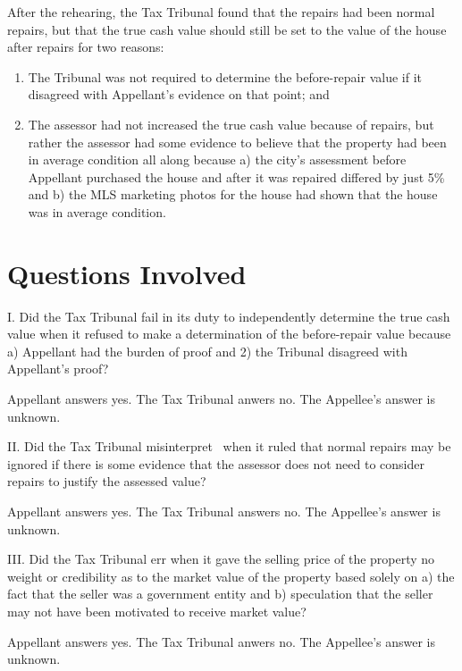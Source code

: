 \documentclass[12pt,\documentclassflag]{michiganCourtOfAppealsBrief}
\def\mathieuGast{\pincite[l]{MCL}{211.27(2)}}
\begin{document}
After the rehearing, the Tax Tribunal found that the repairs had been normal repairs, but that the true cash value should still be set to the value of the house after repairs for two reasons:

\begin{enumerate}
\item The Tribunal was not required to determine the before-repair value if it disagreed with Appellant's evidence on that point; and
\item The assessor had not increased the true cash value because of repairs, but rather the assessor had some evidence to believe that the property had been in average condition all along because a) the city's assessment before Appellant purchased the house and after it was repaired differed by just 5\% and b) the MLS marketing photos for the house had shown that the house was in average condition. 
\end{enumerate}


\newpage 
\section{Questions Involved}

\noindent I. Did the Tax Tribunal fail in its duty to independently determine the true cash value when it refused to make a determination of the before-repair value because a) Appellant had the burden of proof and 2) the Tribunal disagreed with Appellant's proof?

Appellant answers yes. The Tax Tribunal anwers no. The Appellee's answer is unknown. 
\vspace{\baselineskip}

\noindent II. Did the Tax Tribunal misinterpret \mathieuGast\ when it ruled that normal repairs may be ignored if there is some evidence that the assessor does not need to consider repairs to justify the assessed value?

Appellant answers yes. The Tax Tribunal answers no. The Appellee's answer is unknown.

\vspace{\baselineskip}

\noindent III. Did the Tax Tribunal err when it gave the selling price of the property no weight or credibility as to the market value of the property based solely on a) the fact that the seller was a government entity and b) speculation that the seller may not have been motivated to receive market value?

Appellant answers yes. The Tax Tribunal anwers no. The Appellee's answer is unknown. 
\end{document}
